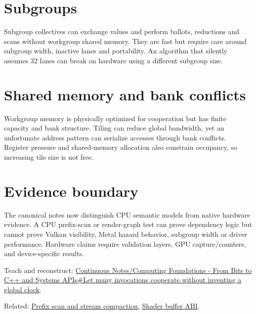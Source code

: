 \section{Subgroups}\label{appendix-f662b5b1773b-subgroups}

Subgroup collectives can exchange values and perform ballots, reductions and scans without workgroup shared memory. They are fast but require care around subgroup width, inactive lanes and portability. An algorithm that silently assumes 32 lanes can break on hardware using a different subgroup size.

\section{Shared memory and bank conflicts}\label{appendix-f662b5b1773b-shared-memory-and-bank-conflicts}

Workgroup memory is physically optimized for cooperation but has finite capacity and bank structure. Tiling can reduce global bandwidth, yet an unfortunate address pattern can serialize accesses through bank conflicts. Register pressure and shared-memory allocation also constrain occupancy, so increasing tile size is not free.

\section{Evidence boundary}\label{appendix-f662b5b1773b-evidence-boundary}

The canonical notes now distinguish CPU semantic models from native hardware evidence. A CPU prefix-scan or render-graph test can prove dependency logic but cannot prove Vulkan visibility, Metal hazard behavior, subgroup width or driver performance. Hardware claims require validation layers, GPU capture/counters, and device-specific results.

Teach and reconstruct: \href{Continuous\%20Notes/Computing\%20Foundations\%20-\%20From\%20Bits\%20to\%20C++\%20and\%20Systems\%20APIs\#Let\%20many\%20invocations\%20cooperate\%20without\%20inventing\%20a\%20global\%20clock}{Continuous Notes/Computing Foundations - From Bits to C++ and Systems APIs\#Let many invocations cooperate without inventing a global clock}.

Related: \hyperref[appendix-f2ee4d086415]{Prefix scan and stream compaction}, \hyperref[appendix-749048795dbb]{Shader buffer ABI}.
